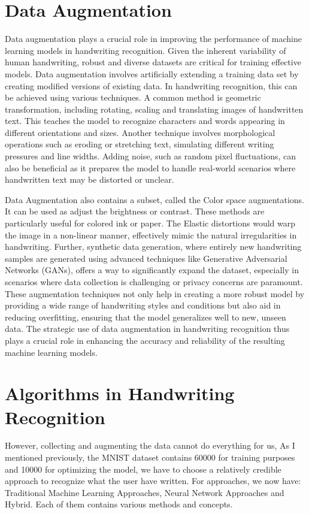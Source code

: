 \documentclass[12pt]{article}
\begin{document}
\section* {Data Augmentation}
Data augmentation plays a crucial role in improving the performance of machine learning models in handwriting recognition. Given the inherent variability of human handwriting, robust and diverse datasets are critical for training effective models. Data augmentation involves artificially extending a training data set by creating modified versions of existing data. In handwriting recognition, this can be achieved using various techniques. A common method is geometric transformation, including rotating, scaling and translating images of handwritten text. This teaches the model to recognize characters and words appearing in different orientations and sizes. Another technique involves morphological operations such as eroding or stretching text, simulating different writing pressures and line widths. Adding noise, such as random pixel fluctuations, can also be beneficial as it prepares the model to handle real-world scenarios where handwritten text may be distorted or unclear.

Data Augmentation also contains a subset, called the Color space augmentations. It can be used as adjust the brightness or contrast. These methods are particularly useful for colored ink or paper. The Elastic distortions would warp the image in a non-linear manner, effectively mimic the natural irregularities in handwriting. Further, synthetic data generation, where entirely new handwriting samples are generated using advanced techniques like Generative Adversarial Networks (GANs), offers a way to significantly expand the dataset, especially in scenarios where data collection is challenging or privacy concerns are paramount. These augmentation techniques not only help in creating a more robust model by providing a wide range of handwriting styles and conditions but also aid in reducing overfitting, ensuring that the model generalizes well to new, unseen data. The strategic use of data augmentation in handwriting recognition thus plays a crucial role in enhancing the accuracy and reliability of the resulting machine learning models.

\section* {Algorithms in Handwriting Recognition}
However, collecting and augmenting the data cannot do everything for us, As I mentioned previously, the MNIST dataset contains 60000 for training purposes and 10000 for optimizing the model, we have to choose a relatively credible approach to recognize what the user have written. For approaches, we now have: Traditional Machine Learning Approaches, Neural Network Approaches and Hybrid. Each of them contains various methods and concepts.
\end{document}
